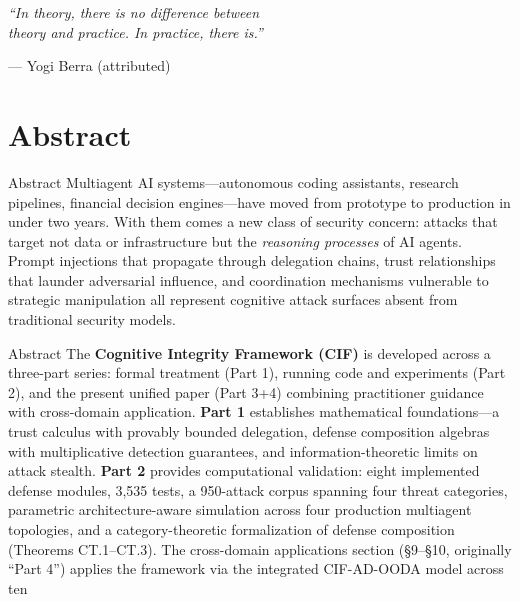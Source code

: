 \documentclass[
  ignorenonframetext,
]{beamer}
\author{\texorpdfstring{}{}}
\date{}
\begin{document}
\begin{frame}
\vspace*{2cm}

\begin{center}
\begin{minipage}{0.7\textwidth}
\centering
\Large\itshape
``In theory, there is no difference between\\[0.3em]
theory and practice. In practice, there is.''
\vspace{1em}

\normalsize\upshape
--- Yogi Berra (attributed)
\end{minipage}
\end{center}

\vspace{2cm}
\end{frame}

\section{Abstract}\label{abstract}

\begin{frame}[allowframebreaks]{Abstract}
Multiagent AI systems---autonomous coding assistants, research
pipelines, financial decision engines---have moved from prototype to
production in under two years. With them comes a new class of security
concern: attacks that target not data or infrastructure but the
\emph{reasoning processes} of AI agents. Prompt injections that
propagate through delegation chains, trust relationships that launder
adversarial influence, and coordination mechanisms vulnerable to
strategic manipulation all represent cognitive attack surfaces absent
from traditional security models.

\end{frame}

\begin{frame}[allowframebreaks]{Abstract}
The \textbf{Cognitive Integrity Framework (CIF)} is developed across a
three-part series: formal treatment (Part 1), running code and
experiments (Part 2), and the present unified paper (Part 3+4) combining
practitioner guidance with cross-domain application. \textbf{Part 1}
establishes mathematical foundations---a trust calculus with provably
bounded delegation, defense composition algebras with multiplicative
detection guarantees, and information-theoretic limits on attack
stealth. \textbf{Part 2} provides computational validation: eight
implemented defense modules, 3,535 tests, a 950-attack corpus spanning
four threat categories, parametric architecture-aware simulation across
four production multiagent topologies, and a category-theoretic
formalization of defense composition (Theorems CT.1--CT.3). The
cross-domain applications section (§9--§10, originally ``Part 4'')
applies the framework via the integrated CIF-AD-OODA model across ten
\end{frame}
\end{document}
